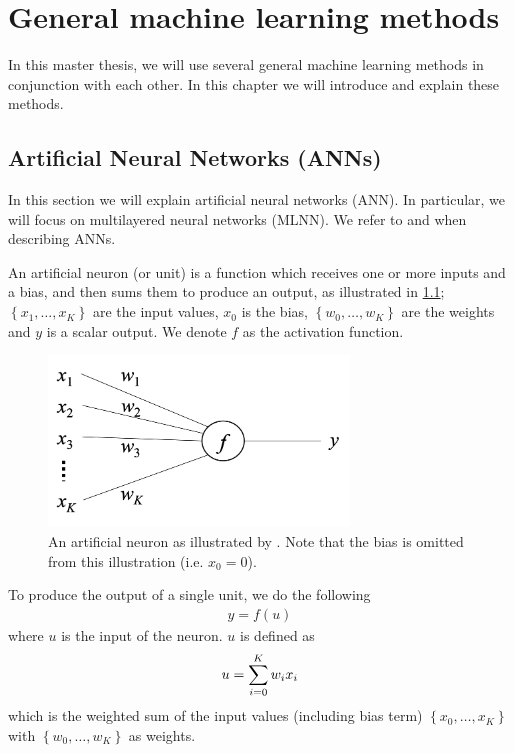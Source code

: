 \chapter{General machine learning methods}
In this master thesis, we will use several general machine learning methods in conjunction with each other. In this chapter we will introduce and explain these methods.

\section{Artificial Neural Networks (ANNs)}
In this section we will explain artificial neural networks (ANN). In particular, we will focus on multilayered neural networks (MLNN). We refer to \cite[Chapter 1]{Aggarwal18} and \cite{rong2016word2vec} when describing ANNs.

\begin{definition}
An artificial neuron (or unit) is a function which receives one or more inputs and a bias, and then sums them to produce an output, as illustrated in \cref{fig:artificial_neuron}; $\left\{ x_1, \ldots, x_K \right\}$ are the input values, $x_0$ is the bias, $\left\{ w_0, \ldots, w_K \right\}$ are the weights and $y$ is a scalar output. We denote $f$ as the activation function.
\end{definition}

\begin{figure}
    \centering
    \includegraphics[width=8cm]{thesis/figures/artificial-neuron-rong-2014.png}
    \caption{An artificial neuron as illustrated by \cite[Figure 5]{rong2016word2vec}. Note that the bias is omitted from this illustration (i.e. $x_0=0$).}
    \label{fig:artificial_neuron}
\end{figure}

To produce the output of a single unit, we do the following
\begin{align}
    y = f(u)
\end{align}
where $u$ is the input of the neuron. $u$ is defined as
\begin{align}
    u = \sum\limits_{i=0}^{K} w_i x_i
\end{align}
which is the weighted sum of the input values (including bias term) $\left\{ x_0, \ldots, x_K \right\}$ with $\left\{ w_0, \ldots, w_K \right\}$ as weights.

